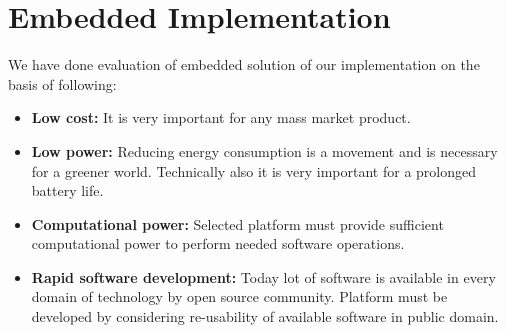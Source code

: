 
\chapter{Embedded Implementation} %
\label{Chapter3}
We have done evaluation of embedded solution of our implementation on
the basis of following:
\begin{itemize}
	\item \textbf{Low cost:} It is very important for any mass
		market product.
	\item \textbf{Low power:} Reducing energy consumption is a
		movement and is necessary for a greener world.
		Technically also it is very important for a prolonged
		battery life.
	\item \textbf{Computational power:} Selected platform must
		provide sufficient computational power to perform
		needed software operations.
	\item \textbf{Rapid software development:} Today lot of software
		is available in every domain of technology by open source
		community. Platform must be developed by considering
		re-usability of available software in public domain.
\end{itemize}
